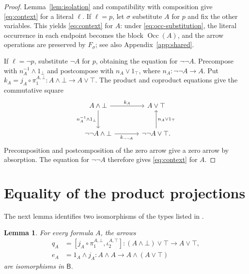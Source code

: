 \documentclass[11pt]{article}
\newtheorem{lemma}[theorem]{Lemma}
\newcommand{\B}{\mathsf B}
\newcommand{\Occ}{\operatorname{Occ}}
\begin{document}
\begin{proof}
Lemma~\ref{lem:isolation} and compatibility with composition give
\eqref{eq:context} for a literal $\ell$.
If $\ell=p$, let $\sigma$ substitute $A$ for $p$ and fix the other variables.
This yields \eqref{eq:context} for $A$: under
\eqref{eq:occ-substitution}, the literal occurrence in each endpoint
becomes the block $\Occ(A)$, and the arrow operations are preserved
by $F_\sigma$; see also Appendix~\ref{app:shared}.

If $\ell=\neg p$, substitute $\neg A$ for $p$, obtaining the equation
for $\neg\neg A$. Precompose with
$n_A^{-1}\wedge1_\bot$ and postcompose with $n_A\vee1_\top$,
where $n_A:\neg\neg A\to A$.
Put
$k_A=j_A\circ\pi_1^{A,\bot}:A\wedge\bot\to A\vee\top$.
The product and coproduct equations give the commutative square
\[
\begin{tikzcd}[column sep=large,row sep=large]
 A\wedge\bot\arrow[r,"k_A"]\arrow[d,"n_A^{-1}\wedge1_\bot"']
   &A\vee\top\\
 \neg\neg A\wedge\bot\arrow[r,"k_{\neg\neg A}"']
   &\neg\neg A\vee\top\arrow[u,"n_A\vee1_\top"'].
\end{tikzcd}
\]
Precomposition and postcomposition of the zero arrow give a zero
arrow by absorption. The equation for $\neg\neg A$ therefore gives
\eqref{eq:context} for $A$.
\end{proof}

\section{Equality of the product projections}\label{sec:collapse}

The next lemma identifies two isomorphisms of the types listed in
\cite[\S12.5, p.~294]{DP}.

\begin{lemma}\label{lem:structural-isos}
For every formula $A$, the arrows
\[
 \begin{aligned}
 q_A&=[j_A\circ\pi_1^{A,\bot},\iota_2^{A,\top}]
      :(A\wedge\bot)\vee\top\longrightarrow A\vee\top,\\
 e_A&=1_A\wedge j_A
      :A\wedge A\longrightarrow A\wedge(A\vee\top)
 \end{aligned}
\]
are isomorphisms in $\B$.
\end{lemma}
\end{document}
